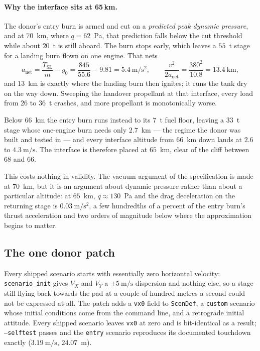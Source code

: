\documentclass[11pt,a4paper]{article}
\newcommand{\code}[1]{\texttt{#1}}
\begin{document}
\paragraph{Why the interface sits at 65\,km.} The donor's entry burn is armed
and cut on a \emph{predicted peak dynamic pressure}, and at $70$~km, where
$q=62$~Pa, that prediction falls below the cut threshold while about $20$~t is
still aboard. The burn stops early, which leaves a $55$~t stage for a landing
burn flown on one engine. That nets
\begin{equation}
a_{\mathrm{net}} = \frac{T_{\mathrm{SL}}}{m} - g_0
 = \frac{845}{55.6} - 9.81 = 5.4\ \mathrm{m/s^2},
\qquad
\frac{v^2}{2a_{\mathrm{net}}} = \frac{380^2}{10.8} = 13.4\ \mathrm{km},
\end{equation}
and $13$~km is exactly where the landing burn then ignites; it runs the tank dry
on the way down. Sweeping the handover propellant at that interface, every load
from $26$ to $36$~t crashes, and more propellant is monotonically worse.

Below $66$~km the entry burn runs instead to its $7$~t fuel floor, leaving a
$33$~t stage whose one-engine burn needs only $2.7$~km --- the regime the donor
was built and tested in --- and every interface altitude from $66$~km down lands
at $2.6$ to $4.3\ \mathrm{m/s}$. The interface is therefore placed at $65$~km,
clear of the cliff between $68$ and $66$.

This costs nothing in validity. The vacuum argument of the specification is made
at $70$~km, but it is an argument about dynamic pressure rather than about a
particular altitude: at $65$~km, $q\approx130$~Pa and the drag deceleration on
the returning stage is $0.03\ \mathrm{m/s^2}$, a few hundredths of a percent of
the entry burn's thrust acceleration and two orders of magnitude below where the
approximation begins to matter.

\subsection{The one donor patch}
\label{sec:donorpatch}

Every shipped scenario starts with essentially zero horizontal velocity:
\code{scenario\_init} gives $V_X$ and $V_Y$ a $\pm5\ \mathrm{m/s}$ dispersion and
nothing else, so a stage still flying back towards the pad at a couple of hundred
metres a second could not be expressed at all. The patch adds a
\code{vx0} field to \code{ScenDef}, a \code{custom} scenario whose initial
conditions come from the command line, and a retrograde initial attitude. Every
shipped scenario leaves \code{vx0} at zero and is bit-identical as a result;
\code{--selftest} passes and the \code{entry} scenario reproduces its documented
touchdown exactly ($3.19\ \mathrm{m/s}$, $24.07$~m).
\end{document}

